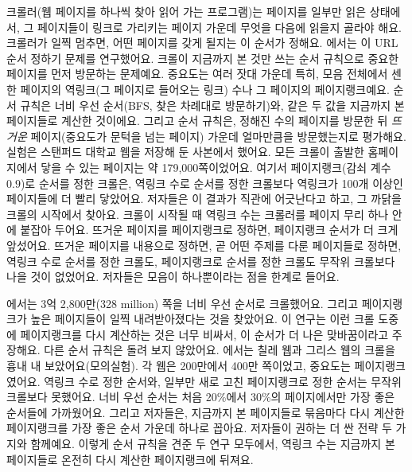 
크롤러(웹 페이지를 하나씩 찾아 읽어 가는 프로그램)는 페이지를 일부만 읽은 상태에서, 그 페이지들이 링크로 가리키는 페이지 가운데 무엇을 다음에 읽을지 골라야 해요. 크롤러가 일찍 멈추면, 어떤 페이지를 갖게 될지는 이 순서가 정해요. \textcite{cho1998crawling}에서는 이 URL 순서 정하기 문제를 연구했어요. 크롤이 지금까지 본 것만 쓰는 순서 규칙으로 중요한 페이지를 먼저 방문하는 문제예요. 중요도는 여러 잣대 가운데 특히, 모음 전체에서 센 한 페이지의 역링크(그 페이지로 들어오는 링크) 수나 그 페이지의 페이지랭크예요. 순서 규칙은 너비 우선 순서(BFS, 찾은 차례대로 방문하기)와, 같은 두 값을 지금까지 본 페이지들로 계산한 것이에요. 그리고 순서 규칙은, 정해진 수의 페이지를 방문한 뒤 \emph{뜨거운} 페이지(중요도가 문턱을 넘는 페이지) 가운데 얼마만큼을 방문했는지로 평가해요. 실험은 스탠퍼드 대학교 웹을 저장해 둔 사본에서 했어요. 모든 크롤이 출발한 홈페이지에서 닿을 수 있는 페이지는 약 179{,}000쪽이었어요. 여기서 페이지랭크(감쇠 계수 $0.9$)로 순서를 정한 크롤은, 역링크 수로 순서를 정한 크롤보다 역링크가 100개 이상인 페이지들에 더 빨리 닿았어요. 저자들은 이 결과가 직관에 어긋난다고 하고, 그 까닭을 크롤의 시작에서 찾아요. 크롤이 시작될 때 역링크 수는 크롤러를 페이지 무리 하나 안에 붙잡아 두어요. 뜨거운 페이지를 페이지랭크로 정하면, 페이지랭크 순서가 더 크게 앞섰어요. 뜨거운 페이지를 내용으로 정하면, 곧 어떤 주제를 다룬 페이지들로 정하면, 역링크 수로 순서를 정한 크롤도, 페이지랭크로 순서를 정한 크롤도 무작위 크롤보다 나을 것이 없었어요. 저자들은 모음이 하나뿐이라는 점을 한계로 들어요.

\textcite{najork2001breadth}에서는 3억 2,800만(328 million) 쪽을 너비 우선 순서로 크롤했어요. 그리고 페이지랭크가 높은 페이지들이 일찍 내려받아졌다는 것을 찾았어요. 이 연구는 이런 크롤 도중에 페이지랭크를 다시 계산하는 것은 너무 비싸서, 이 순서가 더 나은 맞바꿈이라고 주장해요. 다른 순서 규칙은 돌려 보지 않았어요. \textcite{baezayates2005crawling}에서는 칠레 웹과 그리스 웹의 크롤을 흉내 내 보았어요(모의실험). 각 웹은 200만에서 400만 쪽이었고, 중요도는 페이지랭크였어요. 역링크 수로 정한 순서와, 일부만 새로 고친 페이지랭크로 정한 순서는 무작위 크롤보다 못했어요. 너비 우선 순서는 처음 20\%에서 30\%의 페이지에서만 가장 좋은 순서들에 가까웠어요. 그리고 저자들은, 지금까지 본 페이지들로 묶음마다 다시 계산한 페이지랭크를 가장 좋은 순서 가운데 하나로 꼽아요. 저자들이 권하는 더 싼 전략 두 가지와 함께예요. 이렇게 순서 규칙을 견준 두 연구 모두에서, 역링크 수는 지금까지 본 페이지들로 온전히 다시 계산한 페이지랭크에 뒤져요.

